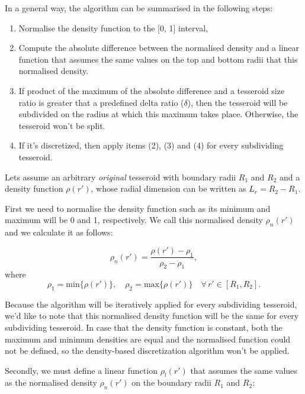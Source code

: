 \documentclass[extra]{gji}
\begin{document}
In a general way, the algorithm can be summarised in the following steps:

\begin{enumerate}
\renewcommand{\theenumi}{(\arabic{enumi})}
    \item Normalise the density function to the [0, 1] interval,
    \item Compute the absolute difference between the normalised 
          density and a linear function that assumes the same values on the 
          top and bottom radii that this normalised density.
    \item If product of the maximum of the absolute difference and a 
          tesseroid size ratio is greater that a predefined delta ratio 
          ($\delta$), then the tesseroid will be subdivided on the 
          radius at which this maximum takes place. Otherwise, the 
          tesseroid won't be split.
    \item If it's discretized, then apply items (2), (3) and (4) for 
          every subdividing tesseroid.
\end{enumerate}

Lets assume an arbitrary \emph{original} tesseroid with boundary radii 
$R_1$ and $R_2$ and a density function $\rho(r')$, whose radial 
dimension can be written as $L_r = R_2 - R_1$.

First we need to normalise the density function such as its minimum and 
maximum will be 0 and 1, respectively.
We call this normalised density $\rho_n(r')$ and we calculate it as 
follows:

\begin{equation}
    \rho_n(r') = \frac{\rho(r') - \rho_1}{\rho_2 - \rho_1},
\end{equation}
\noindent where
\begin{equation}
    \rho_1 = \text{min}\{ \rho(r') \}, \quad
    \rho_2 = \text{max}\{ \rho(r') \} \quad
    \forall \, r' \in [R_1, R_2].
\end{equation}

\noindent Because the algorithm will be iteratively applied for every 
subdividing tesseroid, we'd like to note that this normalised density 
function will be the same for every subdividing tesseroid.
In case that the density function is constant, both the maximum and 
minimum densities are equal and the normalised function could not 
be defined, so the density-based discretization algorithm won't be 
applied.

Secondly, we must define a linear function $\rho_l(r')$ that assumes 
the same values as the normalised density $\rho_n(r')$ on the boundary 
radii $R_1$ and $R_2$:
\end{document}
